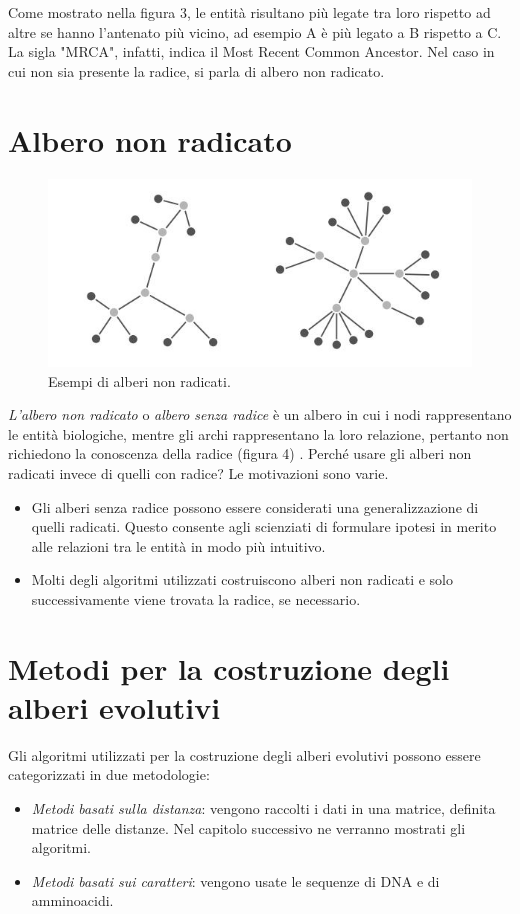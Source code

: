 \newline
Come mostrato nella figura 3, le entità risultano più legate tra loro rispetto ad altre se hanno l'antenato più vicino, ad esempio A è più legato a B rispetto a C. La sigla "MRCA", infatti, indica il Most Recent Common Ancestor.
\newline
Nel caso in cui non sia presente la radice, si parla di albero non radicato.
\newpage

\section{Albero non radicato}
\begin{figure}[h!]
	\includegraphics[width=\linewidth]{unrooted_trees.jpg}
 	\caption{Esempi di alberi non radicati.}
  	\label{fig:RootedTree}
\end{figure}
\textit{L'albero non radicato} o \textit{albero senza radice} è un albero in cui i nodi rappresentano le entità biologiche, mentre gli archi rappresentano la loro relazione, pertanto non richiedono la conoscenza della radice (figura 4) \cite{bioinfalganactivelearningapproachparttwo}.
\newline
Perché usare gli alberi non radicati invece di quelli con radice? Le motivazioni sono varie.
\begin{itemize}
	\item Gli alberi senza radice possono essere considerati una generalizzazione di quelli radicati. Questo consente agli scienziati di formulare ipotesi in merito alle relazioni tra le entità in modo più intuitivo.
	\item Molti degli algoritmi utilizzati costruiscono alberi non radicati e solo successivamente viene trovata la radice, se necessario.
\end{itemize}


\section{Metodi per la costruzione degli alberi evolutivi}
Gli algoritmi utilizzati per la costruzione degli alberi evolutivi possono essere categorizzati in due metodologie:
\begin{itemize}
	\item \textit{Metodi basati sulla distanza}: vengono raccolti i dati in una matrice, definita matrice delle distanze. Nel capitolo successivo ne verranno mostrati gli algoritmi.
	\item \textit{Metodi basati sui caratteri}: vengono usate le sequenze di DNA e di amminoacidi.
\end{itemize}